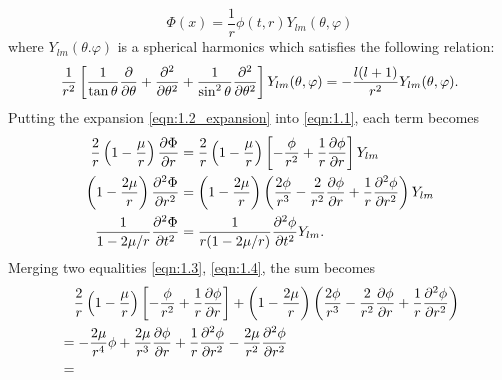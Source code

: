 \documentclass[a4paper,pdftex,10pt]{article}
\begin{document}
\begin{enumerate}
        \begin{equation}
          \Phi(x)
          =
          \frac{1}{r}\phi(t,r)Y_{lm}(\theta,\varphi)
          \label{eqn:1.2_expansion}
        \end{equation}
        where $Y_{lm}(\theta.\varphi)$ is a spherical harmonics which satisfies the following relation:
        \begin{equation}
          \frac{1}{r^2}
          \left[
            \frac{1}{\tan\theta}\pdv{}{\theta}
            +
            \pdv[2]{}{\theta}
            +
            \frac{1}{\sin^2\theta}\pdv[2]{}{\theta}
            \right]
          Y_{lm}(\theta,\varphi)
          =
          -
          \frac{l(l+1)}{r^2}
          Y_{lm}(\theta,\varphi)
          .
        \end{equation}
        Putting the expansion \eqref{eqn:1.2_expansion} into \eqref{eqn:1.1}, each term becomes
        \begin{align}
          \frac{2}{r}\left( 1-\frac{\mu}{r} \right)\pdv{\Phi}{r}
           & =
          \frac{2}{r}\left( 1-\frac{\mu}{r} \right)
          \left[ -\frac{\phi}{r^2}+\frac{1}{r}\pdv{\phi}{r} \right]Y_{lm}
          \label{eqn:1.3}
          \\
          \left( 1-\frac{2\mu}{r} \right)\pdv[2]{\Phi}{r}
           & =
          \left( 1-\frac{2\mu}{r} \right)
          \left( \frac{2\phi}{r^3}-\frac{2}{r^2}\pdv{\phi}{r}+\frac{1}{r}\pdv[2]{\phi}{r} \right)Y_{lm}
          \label{eqn:1.4}
          \\
          \frac{1}{1-2\mu/r}\pdv[2]{\Phi}{t}
           & =
          \frac{1}{r(1-2\mu/r)}\pdv[2]{\phi}{t}Y_{lm}
          .
        \end{align}
        Merging two equalities \eqref{eqn:1.3}, \eqref{eqn:1.4}, the sum becomes
        \begin{align}
           & \hspace*{10pt}
          \frac{2}{r}\left( 1-\frac{\mu}{r} \right)
          \left[ -\frac{\phi}{r^2}+\frac{1}{r}\pdv{\phi}{r} \right]
          +
          \left( 1-\frac{2\mu}{r} \right)
          \left( \frac{2\phi}{r^3}-\frac{2}{r^2}\pdv{\phi}{r}+\frac{1}{r}\pdv[2]{\phi}{r} \right)
          \nonumber
          \\
           & =
          -\frac{2\mu}{r^4}\phi
          +
          \frac{2\mu}{r^3}\pdv{\phi}{r}
          +
          \frac{1}{r}\pdv[2]{\phi}{r}
          -
          \frac{2\mu}{r^2}\pdv[2]{\phi}{r}
          \nonumber
          \\
           & =

\end{align}
\end{enumerate}
\end{document}
